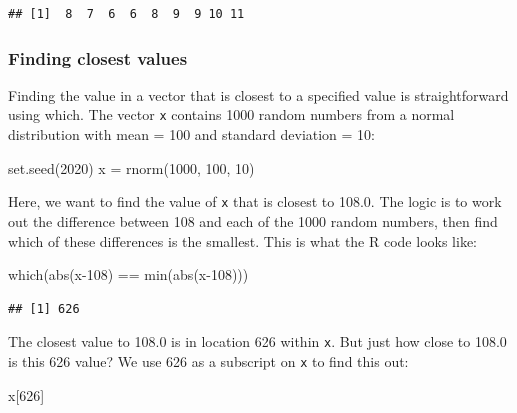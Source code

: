\documentclass[
]{book}
\newenvironment{Shaded}{\begin{snugshade}}{\end{snugshade}}
\newcommand{\DecValTok}[1]{\textcolor[rgb]{0.00,0.00,0.81}{#1}}
\newcommand{\FunctionTok}[1]{\textcolor[rgb]{0.00,0.00,0.00}{#1}}
\newcommand{\NormalTok}[1]{#1}
\newcommand{\OtherTok}[1]{\textcolor[rgb]{0.56,0.35,0.01}{#1}}
\newcommand{\SpecialCharTok}[1]{\textcolor[rgb]{0.00,0.00,0.00}{#1}}
\theoremstyle{definition}
\theoremstyle{definition}
\theoremstyle{definition}
\theoremstyle{definition}
\theoremstyle{remark}
\begin{document}
\begin{verbatim}
## [1]  8  7  6  6  8  9  9 10 11
\end{verbatim}

\hypertarget{finding-closest-values}{%
\subsubsection{Finding closest values}\label{finding-closest-values}}

Finding the value in a vector that is closest to a specified value is straightforward using which. The vector \texttt{x} contains 1000 random numbers from a normal distribution with mean = 100 and standard deviation = 10:

\begin{Shaded}
\begin{Highlighting}[]
\FunctionTok{set.seed}\NormalTok{(}\DecValTok{2020}\NormalTok{)}
\NormalTok{x }\OtherTok{=} \FunctionTok{rnorm}\NormalTok{(}\DecValTok{1000}\NormalTok{, }\DecValTok{100}\NormalTok{, }\DecValTok{10}\NormalTok{)}
\end{Highlighting}
\end{Shaded}

Here, we want to find the value of \texttt{x} that is closest to 108.0. The logic is to work out the difference between 108 and each of the 1000 random numbers, then find which of these differences is the smallest. This is what the R code looks like:

\begin{Shaded}
\begin{Highlighting}[]
\FunctionTok{which}\NormalTok{(}\FunctionTok{abs}\NormalTok{(x}\DecValTok{{-}108}\NormalTok{) }\SpecialCharTok{==} \FunctionTok{min}\NormalTok{(}\FunctionTok{abs}\NormalTok{(x}\DecValTok{{-}108}\NormalTok{)))}
\end{Highlighting}
\end{Shaded}

\begin{verbatim}
## [1] 626
\end{verbatim}

The closest value to 108.0 is in location 626 within \texttt{x}. But just how close to 108.0 is this 626 value? We use 626 as a subscript on \texttt{x} to find this out:

\begin{Shaded}
\begin{Highlighting}[]
\NormalTok{x[}\DecValTok{626}\NormalTok{]}
\end{Highlighting}
\end{Shaded}
\end{document}
